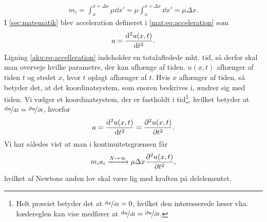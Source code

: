 %
\begin{align}
    m_i = \int_x^{x+\Delta x}\mu\dd{x'} = \mu\int_x^{x+\Delta x}\dd{x'} = \mu\Delta x.
\end{align}
%
I \cref{sec:matematik} blev acceleration defineret i \cref{mat:eq:acceleration} som
%
\begin{align} \label{aku:eq:accelleration}
    a = \dv[2]{u(x,t)}{t}.
\end{align}
%
Ligning \eqref{aku:eq:accelleration} indeholder en totalafledede mht. tid, så derfor skal man overveje hvilke parametre, der kan afhænge af tiden. $u(x,t)$ afhænger af tiden $t$ og stedet $x$, hvor $t$ oplagt afhænger af $t$. Hvis $x$ afhænger af tiden, så betyder det, at det koordinatsystem, som snoren beskrives i, ændrer sig med tiden. Vi vælger et koordinatsystem, der er fastholdt i tid\footnote{Helt præcist betyder det at $\nicefrac{\dd{x}}{\dd{t}} = 0$, hvilket den interesserede læser vha. kædereglen kan vise medfører at $\nicefrac{\dd{u}}{\dd{t}} = \nicefrac{\partial u}{\partial t}$.}, hvilket betyder at $\nicefrac{\dd{u}}{\dd{t}} = \nicefrac{\partial u}{\partial t}$, hvorfor
%
\begin{align}
    a = \dv[2]{u(x,t)}{t} = \pdv[2]{u(x,t)}{t}.
\end{align}
%
Vi har således vist at man i kontinuitetsgrænsen får
%
\begin{align} \label{aku:eq:n2_kin}
    m_ia_i \xrightarrow[]{N\rightarrow\infty} \mu\Delta x \pdv[2]{u(x,t)}{t},
\end{align}
%
hvilket af Newtons anden lov skal være lig med kraften på delelementet.

